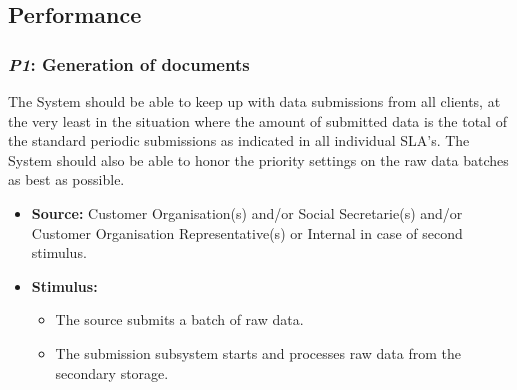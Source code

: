 \documentclass[a4paper,10pt]{article}
\begin{document}
\subsection{Performance}
\subsubsection{\emph{P1}: Generation of documents}
The System should be able to keep up with data submissions from all clients, at the very least in the situation where the amount of submitted data is the total of the standard periodic submissions as indicated in all individual SLA's. The System should also be able to honor the priority settings on the raw data batches as best as possible.

\begin{itemize}
    \item \textbf{Source:} Customer Organisation(s) and/or Social Secretarie(s) and/or Customer Organisation Representative(s) or Internal in case of second stimulus.
    \item \textbf{Stimulus:}
        \begin{itemize}
            \item The source submits a batch of raw data.
            \item The submission subsystem starts and processes raw data from the secondary storage.
        \end{itemize}


\end{itemize}
\end{document}
